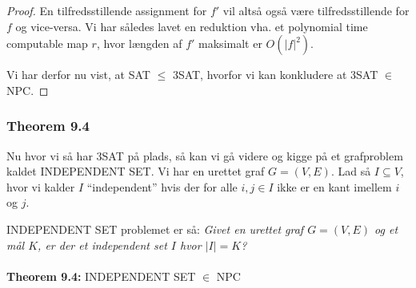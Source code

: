 \begin{proof}
En tilfredsstillende assignment for $f'$ vil altså også være tilfredsstillende
for $f$ og vice-versa. Vi har således lavet en reduktion vha. et polynomial
time computable map $r$, hvor længden af $f'$ maksimalt er $O(|f|^2)$.

Vi har derfor nu vist, at SAT $\leq$ 3SAT, hvorfor vi kan konkludere at 3SAT
$\in$ NPC.
\end{proof}

\subsubsection{Theorem 9.4}

Nu hvor vi så har 3SAT på plads, så kan vi gå videre og kigge på et grafproblem
kaldet INDEPENDENT SET. Vi har en urettet graf $G=(V,E)$. Lad så $I \subseteq
V$, hvor vi kalder $I$ ``independent'' hvis der for alle $i,j \in I$ ikke er en
kant imellem $i$ og $j$. 

INDEPENDENT SET problemet er så: \textit{Givet en urettet graf $G=(V,E)$ og et
mål $K$, er der et independent set $I$ hvor $|I|=K$?}\\
~\\
\textbf{Theorem 9.4:} INDEPENDENT SET $\in$ NPC

